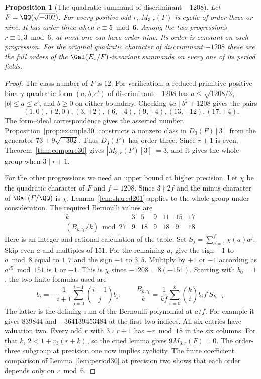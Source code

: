 \documentclass[a4paper,11pt]{article}
\newtheorem{proposition}{Proposition}[section]
\theoremstyle{definition}
\theoremstyle{remark}
\numberwithin{equation}{section}
\begin{document}
\begin{proposition}[The quadratic summand of discriminant \(-1208\)]
\leavevmode\label{prop:quadraticorders608}
Let \(F=\QQ(\sqrt{-302})\). For every positive odd \(r\),
\(M_{3,r}(F)\) is cyclic of order three or nine. It has order
three when \(r\equiv5\bmod6\). Among the two progressions
\(r\equiv1,3\bmod6\), at most one can have order nine. Its
order is constant on each progression. For the original
quadratic character of discriminant \(-1208\) these are the
full orders of the \(\Gal(E_x/F)\)-invariant summands on every
one of its period fields.
\end{proposition}
\begin{proof}
The class number of \(F\) is \(12\). For verification, a reduced
primitive positive binary quadratic form \((a,b,c')\) of
discriminant \(-1208\) has \(a\le\sqrt{1208/3}\),
\(|b|\le a\le c'\), and \(b\ge0\) on either boundary. Checking
\(4a\mid b^2+1208\) gives the pairs
\[
 (1,0),(2,0),(3,\pm2),(6,\pm4),(9,\pm4),
                 (13,\pm12),(17,\pm4).
\]
The form--ideal correspondence gives the asserted number.
Proposition~\ref{prop:example30} constructs a nonzero class
in \(D_3(F)[3]\) from the generator \(73+9\sqrt{-302}\).
Thus \(D_3(F)\) has order three. Since \(r+1\) is even,
Theorem~\ref{thm:compare30} gives
\(|M_{3,r}(F)[3]|=3\), and it gives the whole group when
\(3\mid r+1\).

For the other progressions we need an upper bound at higher
precision. Let \(\chi\) be the quadratic character of \(F\)
and \(f=1208\). Since \(3\nmid2f\) and the minus character of
\(\Gal(F/\QQ)\) is \(\chi\), Lemma~\ref{lem:shared201} applies
to the whole group under consideration. The required Bernoulli
values are
\[
\begin{array}{c|rrrrrr}
 k&3&5&9&11&15&17\\ \hline
 (B_{k,\chi}/k)\bmod27&9&18&9&18&9&18 .
\end{array}
\]
Here is an integer and rational calculation of the table. Set
\(S_j=\sum_{a=1}^f\chi(a)a^j\). Skip even \(a\) and multiples
of \(151\). For the remaining \(a\), give the sign \(+1\) to
\(a\bmod8\) equal to \(1,7\) and the sign \(-1\) to \(3,5\).
Multiply by \(+1\) or \(-1\) according as \(a^{75}\bmod151\)
is \(1\) or \(-1\). This is \(\chi\) since
\(-1208=8(-151)\). Starting with \(b_0=1\), the two finite
formulas used are
\[
 b_i=-\frac1{i+1}\sum_{j=0}^{i-1}\binom{i+1}{j}b_j,\qquad
 \frac{B_{k,\chi}}k=\frac1{kf}
       \sum_{i=0}^k\binom{k}{i}b_i f^i S_{k-i}.
\]
The latter is the defining sum of the Bernoulli polynomial
at \(a/f\). For example it gives \(839844\) and
\(-364139453484\) at the first two indices. All six entries
have valuation two. Every odd \(r\) with \(3\nmid r+1\) has
\(-r\bmod18\) in the six columns. For that \(k\),
\(2<1+v_3(r+k)\), so the cited lemma gives \(9M_{3,r}(F)=0\).
The order-three subgroup at precision one now implies cyclicity.
The finite coefficient comparison of Lemma~\ref{lem:period30}
at precision two shows that each order depends only on \(r\bmod6\).


\end{proof}
\end{document}
